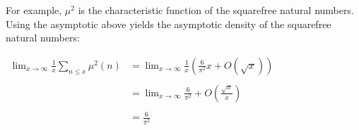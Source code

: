 \documentclass[12pt]{article}
\begin{document}
For example, $\mu^2$ is the characteristic function of the squarefree natural numbers.  Using the asymptotic  above yields the asymptotic density of the squarefree natural numbers:

\begin{center}
$\begin{array}{ll}
\displaystyle \lim_{x \to \infty} \frac{1}{x} \sum_{n \le x} \mu^2(n) & \displaystyle =\lim_{x \to \infty} \frac{1}{x} \left( \frac{6}{\pi^2}x+O(\sqrt{x}) \right) \\
\\
& \displaystyle =\lim_{x \to \infty} \frac{6}{\pi^2}+O \left( \frac{\sqrt{x}}{x} \right) \\
\\
& \displaystyle =\frac{6}{\pi^2} \end{array}$
\end{center}
\end{document}
